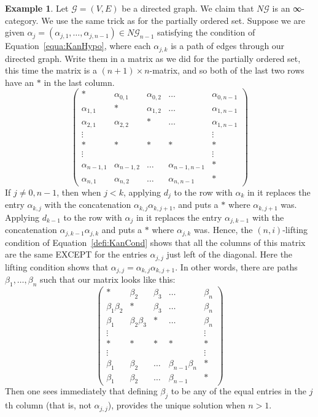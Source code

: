 \documentclass[a4paper]{amsart}
\numberwithin{figure}{section}
\theoremstyle{theorem}
\theoremstyle{definition}
\newtheorem{exam}[thm]{Example}
\newcommand{\cG}{\mathcal{G}}
\begin{document}
\begin{exam}
Let $\cG = (V, E)$ be a directed graph. We claim that $N\cG$ is an ∞-category. We use the same trick as for the partially ordered set. Suppose we are given $\alpha_j = (\alpha_{j,1}, \dots,  \alpha_{j,{n{-}1}}) \in N\cG_{n-1}$ satisfying the condition of Equation~\ref{equa:KanHypo}, where each $\alpha_{j,k}$ is a path of edges through our directed graph. Write them in a matrix as we did for the partially ordered set, this time the matrix is a $(n{+}1) \times n$-matrix, and so both of the last two rows have an $\ast$ in the last column. 
\[
\left (
\begin{array}{ccccc}
\ast & \alpha_{0,1} & \alpha_{0,2} & \dots & \alpha_{0,{n-1}}  \\
\alpha_{1, 1} & \ast & \alpha_{1,2} & \dots & \alpha_{1,{n-1}} \\
\alpha_{2, 1} & \alpha_{2,2} & \ast & \dots & \alpha_{1,{n-1}} \\
\vdots &&&& \vdots \\
\ast & \ast &\ast &\ast &\ast \\
\vdots &&&& \vdots \\
\alpha_{n{-}1, 1} & \alpha_{n{-}1, 2} & \dots & \alpha_{n{-}1, {n-1}} & \ast \\
\alpha_{n, 1} & \alpha_{n, 2} & \dots & \alpha_{n, {n-1}} & \ast 
\end{array}
\right )
\]
If $j \neq 0, n{-}1$, then when $j < k$, applying $d_j$ to the row with $\alpha_k$ in it replaces the entry $\alpha_{k, j}$ with the concatenation $\alpha_{k,j}\alpha_{k,j{+}1}$, and puts a $\ast$ where $\alpha_{k, j{+}1}$ was. Applying $d_{k-1}$ to the row with $\alpha_j$ in it replaces the entry $\alpha_{j,k{-}1}$ with the concatenation $\alpha_{j,k{-}1}\alpha_{j,k}$ and puts a $\ast$ where $\alpha_{j,k}$ was. Hence, the $(n, i)$-lifting condition of Equation~\ref{defi:KanCond} shows that all the columns of this matrix are the same EXCEPT for the entries $\alpha_{j, j}$ just left of the diagonal. Here the lifting condition shows that $\alpha_{j,j} = \alpha_{k, j}\alpha_{k, j{+}1}$. In other words, there are paths $\beta_1, \dots, \beta_n$ such that our matrix looks like this:
\[
\left (
\begin{array}{ccccc}
\ast & \beta_2 & \beta_3 & \dots & \beta_n  \\
\beta_1\beta_2 & \ast & \beta_3 & \dots & \beta_n \\
\beta_1 & \beta_2\beta_3 & \ast & \dots & \beta_n \\
\vdots &&&& \vdots \\
\ast & \ast &\ast &\ast &\ast \\
\vdots &&&& \vdots \\
\beta_1 & \beta_2 & \dots & \beta_{n{-}1}\beta_{n} & \ast \\
\beta_1 & \beta_2 & \dots & \beta_{n-1} & \ast 
\end{array}
\right )
\]
Then one sees immediately that defining $\beta_j$ to be any of the equal entries in the $j$th column (that is, not $\alpha_{j, j}$), provides the unique solution when $n > 1$.
\end{exam}
\end{document}
